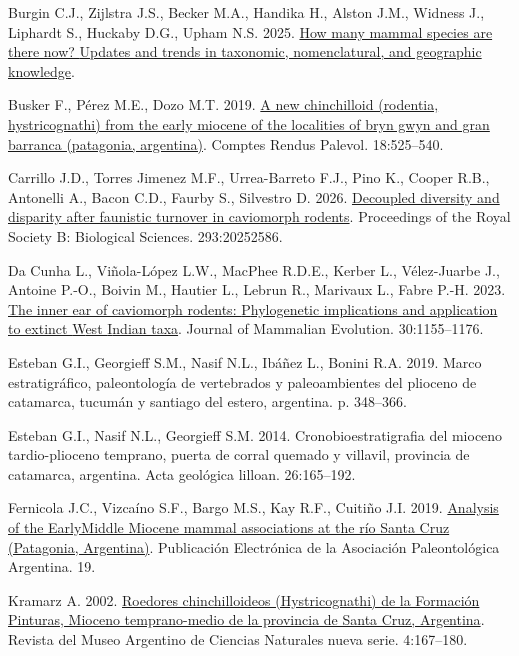 \documentclass[
  9pt,
  letterpaper,
]{article}
\newlength{\cslhangindent}
\newenvironment{CSLReferences}[2] %
 {\begin{list}{}{%
  \setlength{\itemindent}{0pt}
  \setlength{\leftmargin}{0pt}
  \setlength{\parsep}{0pt}
  \ifodd #1
   \setlength{\leftmargin}{\cslhangindent}
   \setlength{\itemindent}{-1\cslhangindent}
  \fi
  \setlength{\itemsep}{#2\baselineskip}}}
 {\end{list}}
\begin{document}
\begin{CSLReferences}{1}{1}
Burgin C.J., Zijlstra J.S., Becker M.A., Handika H., Alston J.M.,
Widness J., Liphardt S., Huckaby D.G., Upham N.S. 2025.
\href{https://doi.org/10.1101/2025.02.27.640393}{{H}ow many mammal
species are there now? {U}pdates and trends in taxonomic, nomenclatural,
and geographic knowledge}.

Busker F., Pérez M.E., Dozo M.T. 2019.
\href{https://doi.org/10.1016/j.crpv.2019.05.003}{A new chinchilloid
(rodentia, hystricognathi) from the early miocene of the localities of
bryn gwyn and gran barranca (patagonia, argentina)}. Comptes Rendus
Palevol. 18:525--540.

Carrillo J.D., Torres Jimenez M.F., Urrea-Barreto F.J., Pino K., Cooper
R.B., Antonelli A., Bacon C.D., Faurby S., Silvestro D. 2026.
\href{https://doi.org/10.1098/rspb.2025.2586}{Decoupled diversity and
disparity after faunistic turnover in caviomorph rodents}. Proceedings
of the Royal Society B: Biological Sciences. 293:20252586.

Da Cunha L., Viñola-López L.W., MacPhee R.D.E., Kerber L., Vélez-Juarbe
J., Antoine P.-O., Boivin M., Hautier L., Lebrun R., Marivaux L., Fabre
P.-H. 2023. \href{https://doi.org/10.1007/s10914-023-09675-3}{{T}he
inner ear of caviomorph rodents: {P}hylogenetic implications and
application to extinct {W}est {I}ndian taxa}. Journal of Mammalian
Evolution. 30:1155--1176.

Esteban G.I., Georgieff S.M., Nasif N.L., Ibáñez L., Bonini R.A. 2019.
Marco estratigráfico, paleontología de vertebrados y paleoambientes del
plioceno de catamarca, tucumán y santiago del estero, argentina. p.
348--366.

Esteban G.I., Nasif N.L., Georgieff S.M. 2014. Cronobioestratigrafia del
mioceno tardio-plioceno temprano, puerta de corral quemado y villavil,
provincia de catamarca, argentina. Acta geológica lilloan. 26:165--192.

Fernicola J.C., Vizcaíno S.F., Bargo M.S., Kay R.F., Cuitiño J.I. 2019.
\href{https://doi.org/10.5710/PEAPA.01.11.2019.309}{Analysis of the
Early{\textendash}Middle Miocene mammal associations at the río Santa
Cruz (Patagonia, Argentina)}. Publicación Electrónica de la Asociación
Paleontológica Argentina. 19.

Kramarz A. 2002.
\href{https://revista.macn.gob.ar/index.php/RevMus/article/view/9}{Roedores
chinchilloideos (Hystricognathi) de la Formación Pinturas, Mioceno
temprano-medio de la provincia de Santa Cruz, Argentina}. Revista del
Museo Argentino de Ciencias Naturales nueva serie. 4:167--180.


\end{CSLReferences}
\end{document}
